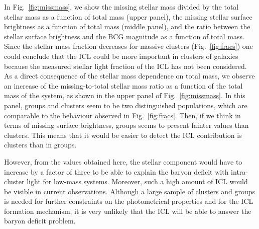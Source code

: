 \documentclass{aa}
\begin{document}
In Fig.~\ref{fig:missmass}, 
we show 
the missing stellar mass divided by the total stellar mass 
as a function of total mass (upper panel),   the missing stellar surface brightness as a function of
total mass (middle panel), and the ratio between the stellar surface brightness and the BCG magnitude
as a function of total mass. Since the stellar mass fraction
decreases for massive clusters (Fig.~\ref{fig:fracs}) one could conclude that the 
ICL could be more important in clusters of galaxies because the measured stellar light fraction of
the ICL has not been considered. 
As a direct consequence of the stellar mass dependence on total mass, we observe an increase 
of the missing-to-total stellar mass ratio
 as a function of the total mass of the system,
as shown in  the upper panel of Fig.~\ref{fig:missmass}.
In this panel, groups and  clusters seem to be two distinguished populations, 
which are comparable to the behaviour observed in  Fig.~\ref{fig:fracs}.
Then, if we think in terms of missing surface brightness, groups seems to present
fainter values than clusters. This means that it would be easier to detect the ICL contribution is 
 clusters than in groups.

However, from the values obtained here, the stellar component would have to increase by a factor of three 
to be able to explain the baryon deficit with intra-cluster light for low-mass systems. Moreover, such a high amount of ICL
would be visible in current observations. Although a large sample of clusters and groups is needed for further constraints 
on the photometrical properties and for the ICL formation mechanism, it is very unlikely that the ICL will
be able to answer the baryon deficit problem.
\end{document}
